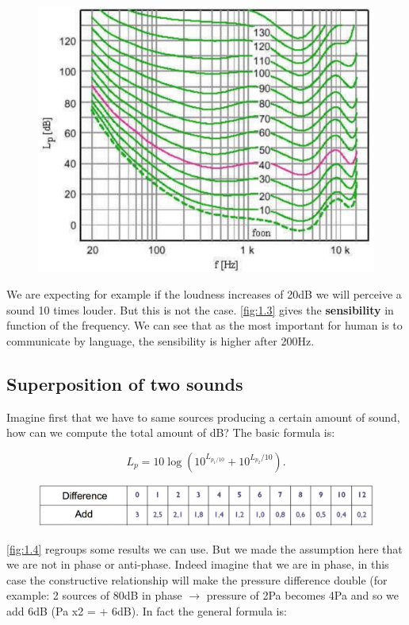 	\begin{figure}
	\vspace{-5mm}
	\includegraphics[scale=0.3]{acoustics/ch1/3}
	\label{fig:1.3}
	\end{figure}	
	We are expecting for example if the loudness increases of 20dB we will perceive a sound 10 times louder. But this is not the case. \autoref{fig:1.3} gives the \textbf{sensibility} in function of the frequency. We can see that as the most important for human is to communicate by language, the sensibility is higher after 200Hz. 
	
\subsection{Superposition of two sounds}
	Imagine first that we have to same sources producing a certain amount of sound, how can we compute the total amount of dB? The basic formula is: 
	
	\begin{equation}
	L_p = 10 \log \left( 10^{L_{p_1/10}} + 10^{L_{p_2}/10} \right). 
	\end{equation}
	
	\begin{figure}
	\vspace{-5mm}
	\includegraphics[scale=0.28]{acoustics/ch1/4}
	\label{fig:1.4}
	\end{figure}
	\autoref{fig:1.4}	regroups some results we can use. But we made the assumption here that we are not in phase or anti-phase. Indeed imagine that we are in phase, in this case the constructive relationship will make the pressure difference double (for example: 2 sources of 80dB in phase $\rightarrow$ pressure of 2Pa becomes 4Pa and so we add 6dB (Pa x2 = + 6dB). In fact the general formula is:
	
